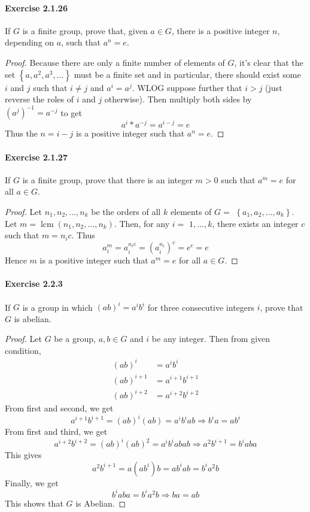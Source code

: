 \documentclass{article}
\begin{document}
\paragraph{Exercise 2.1.26} If $G$ is a finite group, prove that, given $a \in G$, there is a positive integer $n$, depending on $a$, such that $a^n = e$.
\begin{proof}
    Because there are only a finite number of elements of $G$, it's clear that the set $\left\{a, a^2, a^3, \ldots\right\}$ must be a finite set and in particular, there should exist some $i$ and $j$ such that $i \neq j$ and $a^i=a^j$. WLOG suppose further that $i>j$ (just reverse the roles of $i$ and $j$ otherwise). Then multiply both sides by $\left(a^j\right)^{-1}=a^{-j}$ to get
$$
a^i * a^{-j}=a^{i-j}=e
$$
Thus the $n=i-j$ is a positive integer such that $a^n=e$.
\end{proof}



\paragraph{Exercise 2.1.27} If $G$ is a finite group, prove that there is an integer $m > 0$ such that $a^m = e$ for all $a \in G$.
\begin{proof}
    Let $n_1, n_2, \ldots, n_k$ be the orders of all $k$ elements of $G=$ $\left\{a_1, a_2, \ldots, a_k\right\}$. Let $m=\operatorname{lcm}\left(n_1, n_2, \ldots, n_k\right)$. Then, for any $i=$ $1, \ldots, k$, there exists an integer $c$ such that $m=n_i c$. Thus
$$
a_i^m=a_i^{n_i c}=\left(a_i^{n_i}\right)^c=e^c=e
$$
Hence $m$ is a positive integer such that $a^m=e$ for all $a \in G$.
\end{proof}



\paragraph{Exercise 2.2.3} If $G$ is a group in which $(a b)^{i}=a^{i} b^{i}$ for three consecutive integers $i$, prove that $G$ is abelian.
\begin{proof}
    Let $G$ be a group, $a, b \in G$ and $i$ be any integer. Then from given condition,
$$
\begin{aligned}
(a b)^i & =a^i b^i \\
(a b)^{i+1} & =a^{i+1} b^{i+1} \\
(a b)^{i+2} & =a^{i+2} b^{i+2}
\end{aligned}
$$
From first and second, we get
$$
a^{i+1} b^{i+1}=(a b)^i(a b)=a^i b^i a b \Longrightarrow b^i a=a b^i
$$
From first and third, we get
$$
a^{i+2} b^{i+2}=(a b)^i(a b)^2=a^i b^i a b a b \Longrightarrow a^2 b^{i+1}=b^i a b a
$$
This gives
$$
a^2 b^{i+1}=a\left(a b^i\right) b=a b^i a b=b^i a^2 b
$$
Finally, we get
$$
b^i a b a=b^i a^2 b \Longrightarrow b a=a b
$$
This shows that $G$ is Abelian.
\end{proof}
\end{document}
